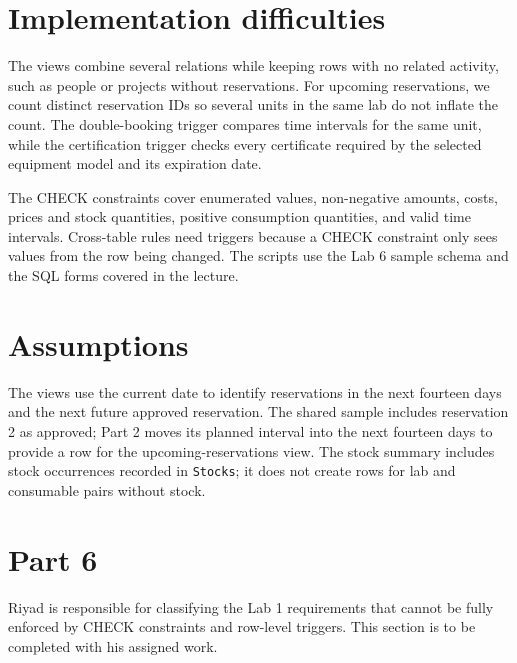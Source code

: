 \documentclass[a4paper,12pt]{article}
\begin{document}
\section*{Implementation difficulties}
The views combine several relations while keeping rows with no related activity, such as people or projects without reservations. For upcoming reservations, we count distinct reservation IDs so several units in the same lab do not inflate the count. The double-booking trigger compares time intervals for the same unit, while the certification trigger checks every certificate required by the selected equipment model and its expiration date.

The CHECK constraints cover enumerated values, non-negative amounts, costs, prices and stock quantities, positive consumption quantities, and valid time intervals. Cross-table rules need triggers because a CHECK constraint only sees values from the row being changed. The scripts use the Lab 6 sample schema and the SQL forms covered in the lecture.

\section*{Assumptions}
The views use the current date to identify reservations in the next fourteen days and the next future approved reservation. The shared sample includes reservation 2 as approved; Part 2 moves its planned interval into the next fourteen days to provide a row for the upcoming-reservations view. The stock summary includes stock occurrences recorded in \texttt{Stocks}; it does not create rows for lab and consumable pairs without stock.

\section*{Part 6}
Riyad is responsible for classifying the Lab 1 requirements that cannot be fully enforced by CHECK constraints and row-level triggers. This section is to be completed with his assigned work.
\end{document}
